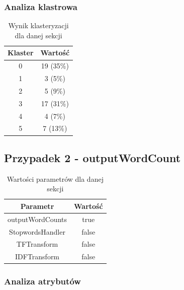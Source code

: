 \documentclass[../EDI_Task2_Karwowski_Kowalewski.tex]{subfiles}
\begin{document}
{{        \subsubsection{Analiza klastrowa} {

            \begin{table}[!htbp]
                \small
                \centering
                \begin{tabular}{|c|c|}
                    \hline
                    Klaster & Wartość \\ \hline
                    0   &  19 (35\%) \\
                    1   &   3 (5\%) \\
                    2   &   5 (9\%) \\
                    3   &  17 (31\%) \\
                    4   &   4 (7\%) \\
                    5   &   7 (13\%) \\ \hline
                \end{tabular}
                \caption{Wynik klasteryzacji dla danej sekcji}
            \end{table}
            \FloatBarrier
        }
    }

    \subsection{Przypadek 2 - outputWordCount} {

        \begin{table}[!htbp]
            \small
            \centering
            \begin{tabular}{|c|c|}
                \hline
                Parametr & Wartość \\ \hline
                outputWordCounts & true \\ \hline
                StopwordsHandler & false \\ \hline
                TFTransform & false \\ \hline
                IDFTransform & false \\ \hline
            \end{tabular}
            \caption{Wartości parametrów dla danej sekcji}
        \end{table}
        \FloatBarrier

        \subsubsection{Analiza atrybutów} {

}}}
\end{document}
